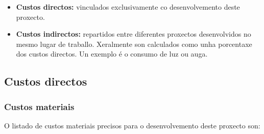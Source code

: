 \begin{itemize}
    \item \textbf{Custos directos:} vinculados exclusivamente co desenvolvemento deste proxecto.
    \item \textbf{Custos indirectos:} repartidos entre diferentes proxectos desenvolvidos no mesmo lugar de traballo. Xeralmente son calculados como unha porcentaxe dos custos directos. Un exemplo é o consumo de luz ou auga.
\end{itemize}

\subsection{Custos directos}

\subsubsection{Custos materiais}
\label{custosMateriaisDirectos}

O listado de custos materiais precisos para o desenvolvemento deste proxecto son:

